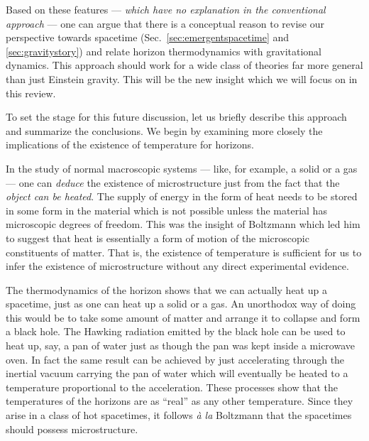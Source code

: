 \documentclass[12pt]{iopart}
\begin{document}
Based on these features --- \textit{which have no explanation in the conventional approach} --- one can argue  that there  is a  conceptual reason  to
 revise  our perspective towards spacetime
(Sec.~\ref{sec:emergentspacetime} and \ref{sec:gravitystory}) and
 relate horizon thermodynamics with gravitational dynamics. This approach
 should work for 
  a wide class of theories far more general than just Einstein gravity. This will be the new insight which we will focus on in this review.

To set the stage for this future discussion,  let us briefly describe
 this approach and summarize the conclusions. We begin by examining
 more closely the implications of the existence of 
temperature for horizons.

In the study of normal macroscopic systems --- like, for example, a solid or a gas --- one can \textit{deduce} the existence of microstructure just from the fact that the \textit{object can be heated}. The supply of energy in the form of heat needs to be stored in some form in the material which is not possible unless the material has microscopic degrees of freedom. This was  the insight of Boltzmann which led him to suggest that heat is essentially a form of motion of the microscopic constituents of matter. That is, the existence of temperature  is sufficient for us to infer the existence of microstructure without any direct experimental evidence. 

The thermodynamics of the horizon shows that we can actually heat up a spacetime, just as one can heat up a solid or a gas. An unorthodox way of doing this would be to take some amount of matter and arrange it to collapse and form a black hole. The Hawking radiation emitted by the black hole can be used to heat up, say, a pan of water just as though the pan was kept inside a microwave oven.
In fact the same result can be achieved by just accelerating through the inertial vacuum carrying the pan of water which will eventually be heated to a temperature proportional to the acceleration. These processes show that the temperatures of the horizons are as ``real'' as any other temperature. Since they arise in a class of hot  spacetimes, 
it follows \textit{\`{a} la} Boltzmann that 
the spacetimes should possess microstructure. 
\end{document}
